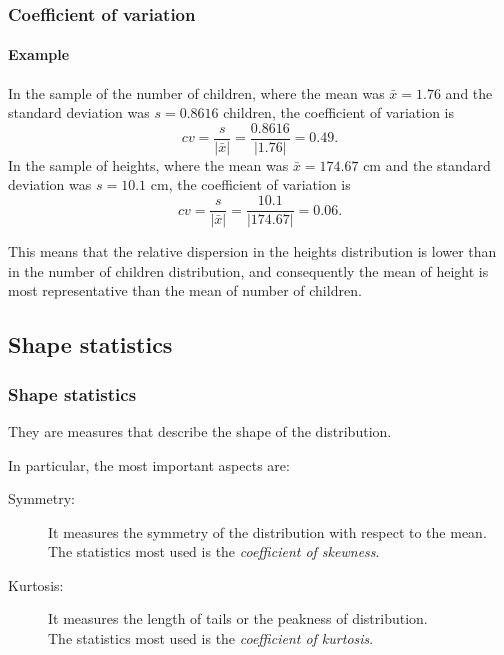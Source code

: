\begin{frame}
\frametitle{Coefficient of variation}
\framesubtitle{Example}
In the sample of the number of children, where the mean was $\bar x=1.76$ and the standard deviation was $s=0.8616$
children, the coefficient of variation is
\[
cv = \frac{s}{|\bar x|} = \frac{0.8616}{|1.76|} = 0.49.
\]
In the sample of heights, where the mean was $\bar x=174.67$ cm and the standard deviation was $s=10.1$ cm, the
coefficient of variation is
\[
cv = \frac{s}{|\bar x|} = \frac{10.1}{|174.67|} = 0.06.
\]

This means that the relative dispersion in the heights distribution is lower than in the number of children
distribution, and consequently the mean of height is most representative than the mean of number of children.
\end{frame}


\subsection{Shape statistics}
\begin{frame}
\frametitle{Shape statistics}
They are measures that describe the shape of the distribution. 

In particular, the most important aspects are:
\begin{description}
\item[Symmetry:] It measures the symmetry of the distribution with respect to the mean. \\
The statistics most used is the \emph{coefficient of skewness}.
\item[Kurtosis:] It measures the length of tails or the peakness of distribution. \\
The statistics most used is the \emph{coefficient of kurtosis}.
\end{description}
\end{frame}


